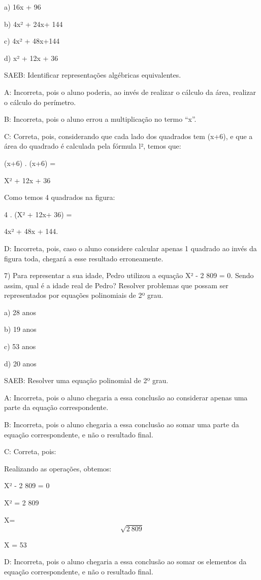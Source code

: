 a) 16x + 96

b) 4x² + 24x+ 144

c) 4x² + 48x+144

d) x² + 12x + 36

SAEB: Identificar representações algébricas equivalentes.

A: Incorreta, pois o aluno poderia, ao invés de realizar o cálculo da
área, realizar o cálculo do perímetro.

B: Incorreta, pois o aluno errou a multiplicação no termo ``x''.

C: Correta, pois, considerando que cada lado dos quadrados tem (x+6), e
que a área do quadrado é calculada pela fórmula l², temos que:

(x+6) . (x+6) =

X² + 12x + 36

Como temos 4 quadrados na figura:

4 . (X² + 12x+ 36) =

4x² + 48x + 144.

D: Incorreta, pois, caso o aluno considere calcular apenas 1 quadrado ao
invés da figura toda, chegará a esse resultado erroneamente.

7) Para representar a sua idade, Pedro utilizou a equação X² - 2 809 =
0. Sendo assim, qual é a idade real de Pedro? Resolver problemas que
possam ser representados por equações polinomiais de 2º grau.

a) 28 anos

b) 19 anos

c) 53 anos

d) 20 anos

SAEB: Resolver uma equação polinomial de 2º grau.

A: Incorreta, pois o aluno chegaria a essa conclusão ao considerar
apenas uma parte da equação correspondente.

B: Incorreta, pois o aluno chegaria a essa conclusão ao somar uma parte
da equação correspondente, e não o resultado final.

C: Correta, pois:

Realizando as operações, obtemos:

X² - 2 809 = 0

X² = 2 809

X= \[\sqrt{2\ 809}\]

X = 53

D: Incorreta, pois o aluno chegaria a essa conclusão ao somar os
elementos da equação correspondente, e não o resultado final.

